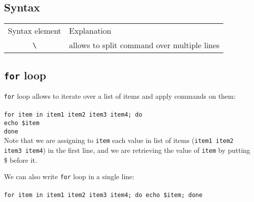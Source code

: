 \documentclass{article}
\begin{document}
\subsection{Syntax}
\begin{tabular}{cl}
  Syntax element & Explanation \\
  \hhline{==}
  \texttt{\textbackslash} & allows to split command over multiple lines\\
  
\end{tabular}
\subsection{\texttt{for} loop}
\texttt{for} loop allows to iterate over a list of items and apply commands on them:\\~\\
\texttt{for item in item1 item2 item3 item4; do\\
  \indent echo \$item \\
done}\\

Note that we are assigning to \texttt{item} each value in list of items 
(\texttt{item1 item2 item3 item4}) in the first line, and we are retrieving
the value of \texttt{item} by putting \$ before it.

We can also write \texttt{for} loop in a single line:\\~\\
\texttt{for item in item1 item2 item3 item4; do echo \$item; done}\\
\end{document}
